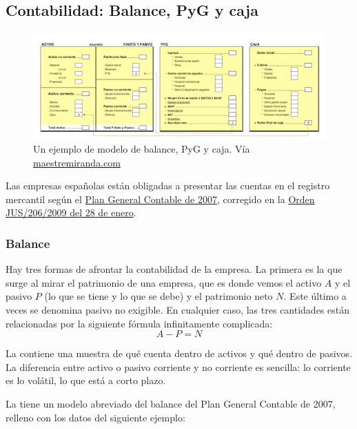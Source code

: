\documentclass[nochap,palatino,notitlepage]{apuntes}
\begin{document}
\subsection{Contabilidad: Balance, PyG y caja}

\begin{figure}[hbtp]
\centering
\includegraphics[width=\textwidth]{img/Balance_PyG_Caja.png}
\caption{Un ejemplo de modelo de balance, PyG y caja. Vía \href{http://maestremiranda.com/techdir/wp-content/uploads/2015/10/EF0.-Bal_PYG_Caja.pdf}{maestremiranda.com}}
\label{fig:BalancePyGCaja}
\end{figure}

Las empresas españolas están obligadas a presentar las cuentas en el registro mercantil según el \href{https://www.boe.es/buscar/doc.php?id=BOE-A-2007-13023}{Plan General Contable de 2007}, corregido en la \href{https://www.boe.es/boe/dias/2009/02/10/pdfs/BOE-A-2009-2276.pdf}{Orden JUS/206/2009 del 28 de enero}.

\subsubsection{Balance}

Hay tres formas de afrontar la contabilidad de la empresa. La primera es la que surge al mirar el patrimonio de una empresa, que es donde vemos el activo $A$ y el pasivo $P$ (lo que se tiene y lo que se debe) y el patrimonio neto $N$. Este último a veces se denomina pasivo no exigible. En cualquier caso, las tres cantidades están relacionadas por la siguiente fórmula infinitamente complicada: \[ A - P = N\]

La  contiene una muestra de qué cuenta dentro de activos y qué dentro de pasivos. La diferencia entre activo o pasivo corriente y no corriente es sencilla: lo corriente es lo volátil, lo que está a corto plazo.

La  tiene un modelo abreviado del balance del Plan General Contable de 2007, relleno con los datos del siguiente ejemplo:
\end{document}
